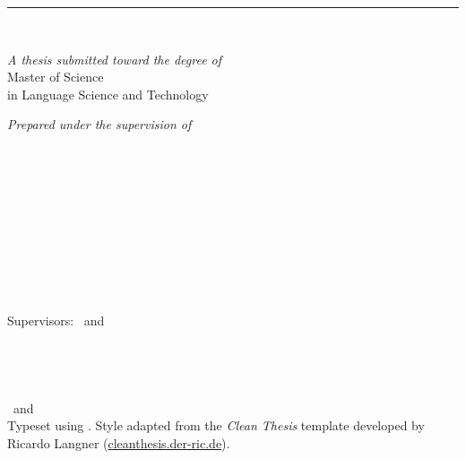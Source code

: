 %
\begin{titlepage}
	\tgherosfont
	\flushright
	\hfill
	\vfill
	
	{\color{ctcolorsection}%
	{\LARGE\textbf{\thesisTitle}} \par
	{\Large \thesisSubtitle} \par
	} %
	
	\rule[5pt]{\textwidth}{.4pt} \par
	
	{\LARGE \authorName} \\[2mm]

	\vfill
	
	
	\textit{A thesis submitted toward the degree of} \\[1mm]
	{\Large Master of Science} \\[1mm]
	{\large in Language Science and Technology} \\	
	
	\vfill	
	
	\textit{Prepared under the supervision of} \\
	\thesisFirstSupervisor \\
	\thesisSecondSupervisor 
	
	\vfill
	
	
	{\Large \thesisUniversity} \\[2mm]
	{\large \thesisUniversityDepartment} \\
	
	\vfill
	
	\thesisDate \\
	
\end{titlepage}


\hfill
\vfill
\small
{\tgherosfont \textbf{\authorName}} \\
\texttt{\authorContact}\\
\textit{\thesisTitle} \\
\thesisDate \\
Supervisors: \thesisFirstSupervisor\ and \thesisSecondSupervisor \\

{\tgherosfont \textbf{\thesisUniversity}} \\
\thesisUniversityDepartment \\
\thesisUniversityInstitute \\
\thesisUniversityStreetAddress \\
\thesisUniversityPostalCode\ and \thesisUniversityCity \\[1.5em]

Typeset using \LaTeXe.
Style adapted from the \textit{Clean Thesis} template developed by Ricardo Langner (\url{cleanthesis.der-ric.de}).
